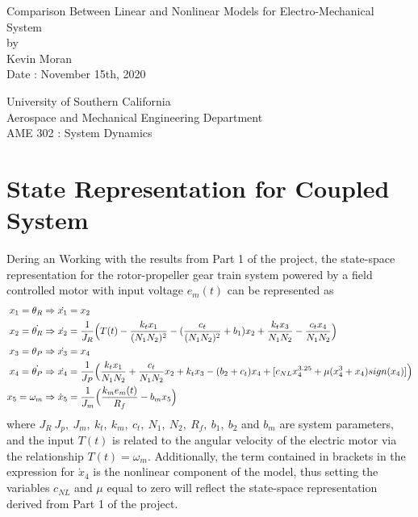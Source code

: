 \documentclass[letterpaper,12pt]{article}
\begin{document}
\begin{titlepage}
 \begin{center}
 \vspace*{1in}
{\Huge Comparison Between Linear and Nonlinear Models for Electro-Mechanical System}\\
    \bigskip
    by\\
    \bigskip
    {\Large Kevin Moran} \\
    \bigskip
    Date : November 15th, 2020

    \bigskip\bigskip\bigskip
    University of Southern California\\
    Aerospace and Mechanical Engineering Department\\
    AME 302 : System Dynamics
 \end{center}
\end{titlepage}


\section{State Representation for Coupled System}
Dering an 
Working with the results from Part 1 of the project, the state-space representation for the rotor-propeller gear train system powered by a field controlled motor with input voltage $e_m(t)$ can be represented as 
\begin{align*}
    x_1 = \theta_R & \Rightarrow \dot{x_1} = x_2\\
    x_2 = \dot{\theta_R} & \Rightarrow \dot{x_2} = {\small \frac{1}{J_R} \Big(T(t) -\frac{k_tx_1}{(N_1N_2)^2} - (\frac{c_t}{(N_1N_2)^2} + b_1)x_2 + \frac{k_tx_3}{N_1N_2} -\frac{c_tx_4}{N_1N_2} \Big)}\\
    x_3 = \theta_P & \Rightarrow \dot{x_3} = x_4\\
    x_4 = \dot{\theta_P} & \Rightarrow \dot{x_4} = {\small \frac{1}{J_P} \Big( \frac{k_tx_1}{N_1N_2} + \frac{c_t}{N_1N_2}x_2 + k_tx_3 - (b_2 + c_t)x_4 + [c_{NL}x_4^{3.25} + \mu(x_4^3 + x_4)sign(x_4)] \Big)}\\
    x_5 = \omega_m & \Rightarrow \dot{x}_5 = \frac{1}{J_m} \Big(\frac{k_me_m(t)}{R_f} - b_mx_5 \Big)
\end{align*}
where $J_R\ J_p,\ J_m,\ k_t,\ k_m,\ c_t,\ N_1,\ N_2,\ R_f,\ b_1,\ b_2$ and $b_m$ are system parameters, and the input $T(t)$ is related to the angular velocity of the electric motor via the relationship $T(t) = \omega_m$. Additionally, the term contained in brackets in the expression for $\dot{x}_4$ is the nonlinear component of the model, thus setting the variables $c_{NL}$ and $\mu$ equal to zero will reflect the state-space representation derived from Part 1 of the project.
\end{document}
